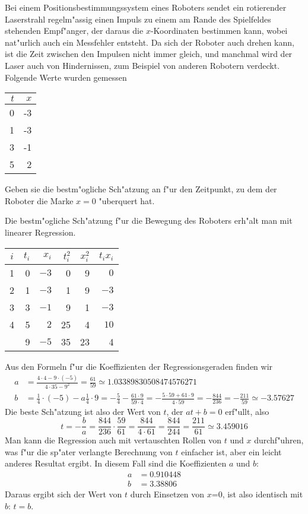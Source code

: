 Bei einem Positionsbestimmungssystem eines Roboters sendet ein rotierender
Laserstrahl regelm"assig einen Impuls zu einem am Rande des Spielfeldes
stehenden Empf"anger, der daraus die $x$-Koordinaten bestimmen kann,
wobei nat"urlich auch ein Messfehler entsteht.
Da sich der Roboter auch drehen kann, ist die Zeit zwischen den Impulsen
nicht immer gleich, und manchmal wird der Laser auch von Hindernissen, zum
Beispiel von anderen Robotern verdeckt. Folgende Werte wurden gemessen
\begin{center}
\begin{tabular}{|r|r|}
\hline
$t$&$x$\\
\hline
0&-3\\
1&-3\\
3&-1\\
5&2\\
\hline
\end{tabular}
\end{center}
Geben sie die bestm"ogliche Sch"atzung an f"ur den Zeitpunkt,
zu dem der Roboter die Marke $x=0$ "uberquert hat.

\begin{loesung}
Die bestm"ogliche Sch"atzung f"ur die Bewegung des Roboters erh"alt
man mit linearer Regression.
\begin{center}
\begin{tabular}{|c|rr|rr|r|}
\hline
$i$&$t_i$&$x_i$&$t_i^2$&$x_i^2$&$t_ix_i$\\
\hline
1&0&$-3$& 0&9&$ 0$\\
2&1&$-3$& 1&9&$-3$\\
3&3&$-1$& 9&1&$-3$\\
4&5&$ 2$&25&4&$10$\\
\hline
&9&$-5$&35&23&4\\
\hline
\end{tabular}
\end{center}
Aus den Formeln f"ur die Koeffizienten der Regressionsgeraden finden
wir
\begin{align*}
a&=\frac{4\cdot 4 -9\cdot(-5)}{4\cdot 35-9^2}=\frac{61}{59}
\simeq 1.03389830508474576271
\\
b&=\frac14\cdot (-5)-a\frac14\cdot 9
=-\frac54-\frac{61\cdot 9}{59\cdot 4}
=-\frac{5\cdot 59+61\cdot 9}{4\cdot 59}
=-\frac{844}{236}
=-\frac{211}{59}
\simeq
-3.57627
\end{align*}
Die beste Sch"atzung ist also der Wert von $t$, der
$at+b=0$ erf"ullt, also
\[
t=-\frac{b}{a}=\frac{844}{236}\cdot\frac{59}{61}
=\frac{844}{4\cdot 61}=\frac{844}{244}
=\frac{211}{61}
\simeq 3.459016
\]
Man kann die Regression auch mit vertauschten Rollen von $t$ und $x$
durchf"uhren, was f"ur die sp"ater verlangte Berechnung von $t$
einfacher ist, aber ein leicht anderes Resultat ergibt. In diesem
Fall sind die Koeffizienten $a$ und $b$:
\begin{align*}
a&=0.910448\\
b&=3.38806
\end{align*}
Daraus ergibt sich der Wert von $t$ durch Einsetzen von $x$=0, ist
also identisch mit $b$: $t=b$.
\end{loesung}

